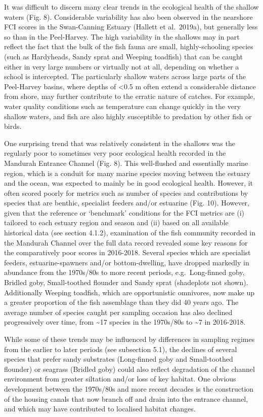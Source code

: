\documentclass[
]{book}
\begin{document}
It was difficult to discern many clear trends in the ecological health of the shallow waters (Fig. 8). Considerable variability has also been observed in the nearshore FCI scores in the Swan-Canning Estuary (Hallett et al.~2019a), but generally less so than in the Peel-Harvey. The high variability in the shallows may in part reflect the fact that the bulk of the fish fauna are small, highly-schooling species (such as Hardyheads, Sandy sprat and Weeping toadfish) that can be caught either in very large numbers or virtually not at all, depending on whether a school is intercepted. The particularly shallow waters across large parts of the Peel-Harvey basins, where depths of \textless0.5 m often extend a considerable distance from shore, may further contribute to the erratic nature of catches. For example, water quality conditions such as temperature can change quickly in the very shallow waters, and fish are also highly susceptible to predation by other fish or birds.

One surprising trend that was relatively consistent in the shallows was the regularly poor to sometimes very poor ecological health recorded in the Mandurah Entrance Channel (Fig. 8). This well-flushed and essentially marine region, which is a conduit for many marine species moving between the estuary and the ocean, was expected to mainly be in good ecological health. However, it often scored poorly for metrics such as number of species and contributions by species that are benthic, specialist feeders and/or estuarine (Fig. 10). However, given that the reference or `benchmark' conditions for the FCI metrics are (i) tailored to each estuary region and season and (ii) based on all available historical data (see section 4.1.2), examination of the fish community recorded in the Mandurah Channel over the full data record revealed some key reasons for the comparatively poor scores in 2016-2018. Several species which are specialist feeders, estuarine-spawners and/or bottom-dwelling, have dropped markedly in abundance from the 1970s/80s to more recent periods, e.g.~Long-finned goby, Bridled goby, Small-toothed flounder and Sandy sprat (shadeplots not shown). Additionally Weeping toadfish, which are opportunistic omnivores, now make up a greater proportion of the fish assemblage than they did 40 years ago. The average number of species caught per sampling occasion has also declined progressively over time, from \textasciitilde17 species in the 1970s/80s to \textasciitilde7 in 2016-2018.~

While some of these trends may be influenced by differences in sampling regimes from the earlier to later periods (see subsection 5.1), the declines of several species that prefer sandy substrates (Long-finned goby and Small-toothed flounder) or seagrass (Bridled goby) could also reflect degradation of the channel environment from greater siltation and/or loss of key habitat. One obvious development between the 1970s/80s and more recent decades is the construction of the housing canals that now branch off and drain into the entrance channel, and which may have contributed to localised habitat changes.
\end{document}
